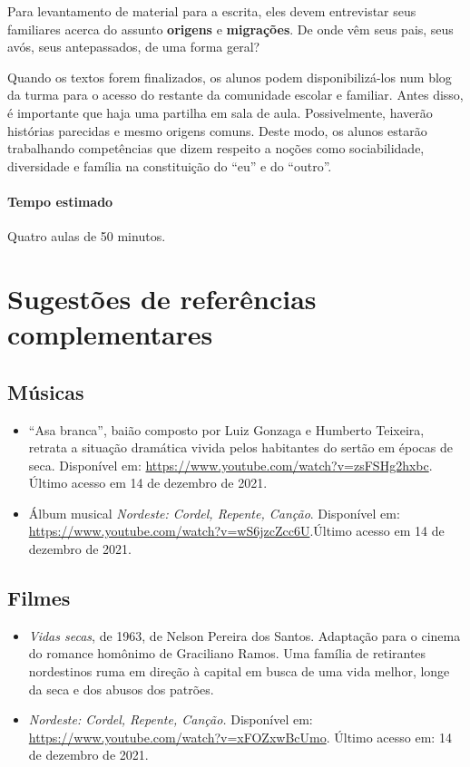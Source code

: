 \documentclass[11pt]{extarticle}
\begin{document}
Para levantamento de material para a escrita, eles devem
entrevistar seus familiares acerca do assunto \textbf{origens}
e \textbf{migrações}. De onde vêm seus pais, seus avós, seus 
antepassados, de uma forma geral? 

Quando os textos forem finalizados, os alunos podem disponibilizá-los 
num blog da turma para o acesso do restante da comunidade escolar 
e familiar. Antes disso, é importante que haja uma partilha em sala de aula.
Possivelmente, haverão histórias parecidas e mesmo origens comuns.
Deste modo, os alunos estarão trabalhando competências que dizem
respeito a noções como sociabilidade, diversidade e família na 
constituição do ``eu'' e do ``outro''.


\paragraph{Tempo estimado} Quatro aulas de 50 minutos.


\section{Sugestões de referências complementares}

\subsection{Músicas} 

\begin{itemize}
	\item ``Asa branca'', baião composto por Luiz Gonzaga e Humberto Teixeira, retrata 
a situação dramática vivida pelos habitantes do sertão em épocas de seca. Disponível em:
\url{https://www.youtube.com/watch?v=zsFSHg2hxbc}. Último acesso em 14 de dezembro de 2021.

	\item Álbum musical \textit{Nordeste: Cordel, Repente, Canção}. Disponível em: \url{https://www.youtube.com/watch?v=wS6jzcZcc6U}.Último acesso em 14 de dezembro de 2021.

\end{itemize}

\subsection{Filmes}

\begin{itemize}

	\item \textit{Vidas secas}, de 1963, de Nelson Pereira dos Santos. Adaptação para o cinema do romance homônimo
de Graciliano Ramos. Uma família de retirantes nordestinos ruma em direção à capital em busca de uma vida
melhor, longe da seca e dos abusos dos patrões. 

	\item \textit{Nordeste: Cordel, Repente, Canção.} Disponível em: \url{https://www.youtube.com/watch?v=xFOZxwBcUmo}. Último acesso em: 14 de dezembro de 2021.

\end{itemize}
\end{document}
